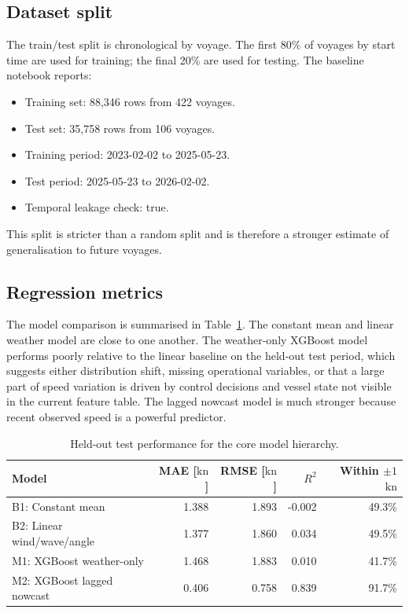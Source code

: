 \documentclass[10pt,a4paper]{article}
\newcommand{\kn}{\ensuremath{\mathrm{kn}}}
\begin{document}
\subsection{Dataset split}

The train/test split is chronological by voyage. The first 80\% of voyages by
start time are used for training; the final 20\% are used for testing. The
baseline notebook reports:

\begin{itemize}
    \item Training set: 88,346 rows from 422 voyages.
    \item Test set: 35,758 rows from 106 voyages.
    \item Training period: 2023-02-02 to 2025-05-23.
    \item Test period: 2025-05-23 to 2026-02-02.
    \item Temporal leakage check: true.
\end{itemize}

This split is stricter than a random split and is therefore a stronger estimate
of generalisation to future voyages.

\subsection{Regression metrics}

The model comparison is summarised in Table~\ref{tab:model-metrics}. The
constant mean and linear weather model are close to one another. The weather-only
XGBoost model performs poorly relative to the linear baseline on the held-out
test period, which suggests either distribution shift, missing operational
variables, or that a large part of speed variation is driven by control decisions
and vessel state not visible in the current feature table. The lagged nowcast
model is much stronger because recent observed speed is a powerful predictor.

\begin{table}[H]
\centering
\caption{Held-out test performance for the core model hierarchy.}
\label{tab:model-metrics}
\begin{tabular}{lrrrr}
\toprule
\textbf{Model} & \textbf{MAE [\kn]} & \textbf{RMSE [\kn]} & \textbf{$R^2$} & \textbf{Within $\pm 1$ \kn} \\
\midrule
B1: Constant mean & 1.388 & 1.893 & -0.002 & 49.3\% \\
B2: Linear wind/wave/angle & 1.377 & 1.860 & 0.034 & 49.5\% \\
M1: XGBoost weather-only & 1.468 & 1.883 & 0.010 & 41.7\% \\
M2: XGBoost lagged nowcast & 0.406 & 0.758 & 0.839 & 91.7\% \\
\bottomrule
\end{tabular}
\end{table}
\end{document}
